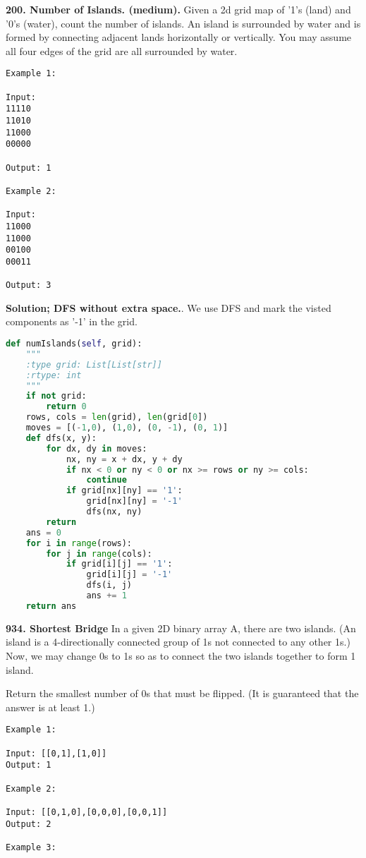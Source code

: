 \documentclass[../main.tex]{subfiles}
\begin{document}
\begin{examples}[resume]
\item \textbf{200. Number of Islands. (medium).} Given a 2d grid map of '1's (land) and '0's (water), count the number of islands. An island is surrounded by water and is formed by connecting adjacent lands horizontally or vertically. You may assume all four edges of the grid are all surrounded by water.
\begin{lstlisting}[numbers=none]
Example 1:

Input:
11110
11010
11000
00000

Output: 1

Example 2:

Input:
11000
11000
00100
00011

Output: 3
\end{lstlisting}
\textbf{Solution; DFS without extra space.}. We use DFS and mark the visted components as '-1' in the grid.
\begin{lstlisting}[language=Python]
def numIslands(self, grid):
    """
    :type grid: List[List[str]]
    :rtype: int
    """
    if not grid:
        return 0
    rows, cols = len(grid), len(grid[0])
    moves = [(-1,0), (1,0), (0, -1), (0, 1)]
    def dfs(x, y):
        for dx, dy in moves:
            nx, ny = x + dx, y + dy
            if nx < 0 or ny < 0 or nx >= rows or ny >= cols:
                continue
            if grid[nx][ny] == '1':
                grid[nx][ny] = '-1'
                dfs(nx, ny)
        return
    ans = 0
    for i in range(rows):
        for j in range(cols):
            if grid[i][j] == '1':
                grid[i][j] = '-1'
                dfs(i, j)
                ans += 1
    return ans
\end{lstlisting}
\item \textbf{934. Shortest Bridge} In a given 2D binary array A, there are two islands.  (An island is a 4-directionally connected group of 1s not connected to any other 1s.) Now, we may change 0s to 1s so as to connect the two islands together to form 1 island.

Return the smallest number of 0s that must be flipped.  (It is guaranteed that the answer is at least 1.)
\begin{lstlisting}[numbers=none]
Example 1:

Input: [[0,1],[1,0]]
Output: 1

Example 2:

Input: [[0,1,0],[0,0,0],[0,0,1]]
Output: 2

Example 3:


\end{lstlisting}
\end{examples}
\end{document}
